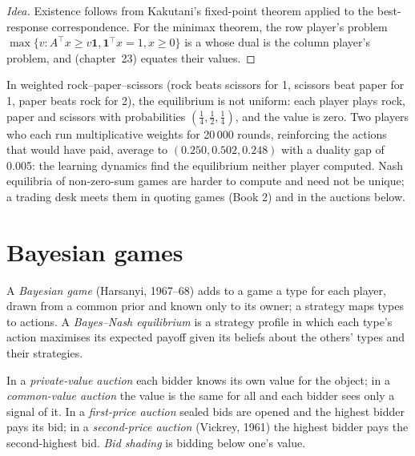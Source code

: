 \begin{proof}[Idea]
Existence follows from Kakutani's fixed-point theorem applied to the best-response correspondence. For the minimax theorem, the row player's problem $\max\{v : A^\top x \ge v\mathbf 1, \mathbf 1^\top x = 1, x \ge
0\}$ is a  whose dual is the column player's problem, and  (chapter~23) equates their values.
\end{proof}

In weighted rock--paper--scissors (rock beats scissors for 1, scissors beat paper for 1, paper beats rock for 2), the equilibrium is not uniform: each player plays rock, paper and scissors with probabilities
$(\frac14, \frac12, \frac14)$, and the value is zero. Two players who each run multiplicative weights for 20\,000 rounds, reinforcing the actions that would have paid, average to $(0.250, 0.502, 0.248)$ with a
duality gap of 0.005: the learning dynamics find the equilibrium neither player computed. Nash equilibria of non-zero-sum games are harder to compute and need not be unique; a trading desk meets them in
quoting games (Book 2) and in the auctions below.

\section{Bayesian games}

\begin{definition}\label{def:qm:games-auctions-and-information:bayes}
A \emph{Bayesian game} (Harsanyi, 1967--68) adds to a game a type for each player, drawn from a common prior and known only to its owner; a strategy maps types to actions. A
\emph{Bayes--Nash equilibrium} is a strategy profile in which each type's action maximises its expected payoff given its beliefs about the others' types and their strategies.
\end{definition}

\begin{definition}\label{def:qm:games-auctions-and-information:auctions}
In a \emph{private-value auction} each bidder knows its own value for the object; in a \emph{common-value auction} the value is the same for all and each
bidder sees only a signal of it. In a \emph{first-price auction} sealed bids are opened and the highest bidder pays its bid; in a \emph{second-price auction}
(Vickrey, 1961) the highest bidder pays the second-highest bid. \emph{Bid shading} is bidding below one's value.
\end{definition}


